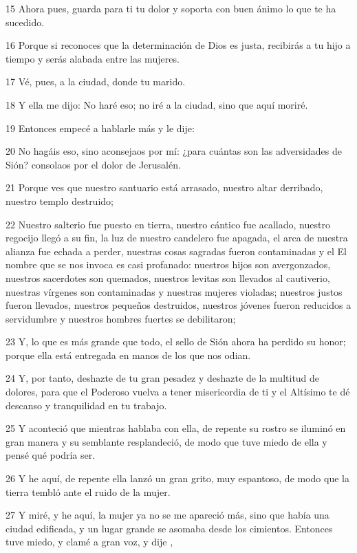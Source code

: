 \par 15 Ahora pues, guarda para ti tu dolor y soporta con buen ánimo lo que te ha sucedido.
\par 16 Porque si reconoces que la determinación de Dios es justa, recibirás a tu hijo a tiempo y serás alabada entre las mujeres.
\par 17 Vé, pues, a la ciudad, donde tu marido.
\par 18 Y ella me dijo: No haré eso; no iré a la ciudad, sino que aquí moriré.
\par 19 Entonces empecé a hablarle más y le dije:
\par 20 No hagáis eso, sino aconsejaos por mí: ¿para cuántas son las adversidades de Sión? consolaos por el dolor de Jerusalén.
\par 21 Porque ves que nuestro santuario está arrasado, nuestro altar derribado, nuestro templo destruido;
\par 22 Nuestro salterio fue puesto en tierra, nuestro cántico fue acallado, nuestro regocijo llegó a su fin, la luz de nuestro candelero fue apagada, el arca de nuestra alianza fue echada a perder, nuestras cosas sagradas fueron contaminadas y el El nombre que se nos invoca es casi profanado: nuestros hijos son avergonzados, nuestros sacerdotes son quemados, nuestros levitas son llevados al cautiverio, nuestras vírgenes son contaminadas y nuestras mujeres violadas; nuestros justos fueron llevados, nuestros pequeños destruidos, nuestros jóvenes fueron reducidos a servidumbre y nuestros hombres fuertes se debilitaron;
\par 23 Y, lo que es más grande que todo, el sello de Sión ahora ha perdido su honor; porque ella está entregada en manos de los que nos odian.
\par 24 Y, por tanto, deshazte de tu gran pesadez y deshazte de la multitud de dolores, para que el Poderoso vuelva a tener misericordia de ti y el Altísimo te dé descanso y tranquilidad en tu trabajo.
\par 25 Y aconteció que mientras hablaba con ella, de repente su rostro se iluminó en gran manera y su semblante resplandeció, de modo que tuve miedo de ella y pensé qué podría ser.
\par 26 Y he aquí, de repente ella lanzó un gran grito, muy espantoso, de modo que la tierra tembló ante el ruido de la mujer.
\par 27 Y miré, y he aquí, la mujer ya no se me apareció más, sino que había una ciudad edificada, y un lugar grande se asomaba desde los cimientos. Entonces tuve miedo, y clamé a gran voz, y dije ,
